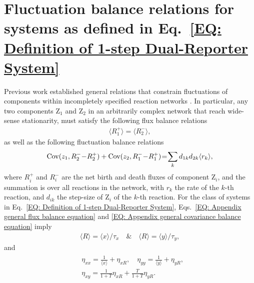 \documentclass[%
 reprint,prx,
superscriptaddress,
%
%
%
%
%
%
%
%
%
 amsmath,amssymb,
 aps,
%
%
%
%
%
%
]{revtex4-2}
\newcommand{\lb}{\langle}
\newcommand{\rb}{\rangle}
\begin{document}
\section{Fluctuation balance relations for systems as defined in Eq.~\eqref{EQ: Definition of 1-step Dual-Reporter System}}\vspace{-.75em}
\label{SEC: Appendix fluctuation balance relations}
%
%
%
Previous work established general relations that constrain fluctuations of components within incompletely specified reaction networks \cite{hilfinger2015a}.
%
%
%
%
%
In particular, any two components Z$_{1}$ and Z$_{2}$ in an arbitrarily complex network that reach wide-sense stationarity, must satisfy the following flux balance relations 
\begin{align}
    \langle R_{1}^{+} \rangle = \langle R_{2}^{-}\rangle,
    \label{EQ: Appendix general flux balance equation}
\end{align}
as well as the following fluctuation balance relations
\begin{align}
    \text{Cov}(z_{1},R_{2}^{-}\hspace{-.2em}-\hspace{-.2em} R_{2}^{+}) + \text{Cov}(z_{2},R_{1}^{-} \hspace{-.2em}-\hspace{-.2em} R_{1}^{+})  \hspace{-.2em}=\hspace{-.2em} \sum_{k}d_{1k}d_{2k}\langle r_{k}\rangle,
    \label{EQ: Appendix general covariance balance equation}
\end{align}
where $R_{i}^{+}$ and $R_{i}^{-}$ are the net birth and death fluxes of component Z$_{i}$, and  the summation  is over all reactions in the network, with $r_{k}$ the rate of the $k$-th reaction, and $d_{ik}$ the step-size of Z$_{i}$ of the $k$-th reaction. For the class of systems in Eq.~\eqref{EQ: Definition of 1-step Dual-Reporter System}, 
Eqs.~\eqref{EQ: Appendix general flux balance equation} and \eqref{EQ: Appendix general covariance balance equation} imply
\begin{align}
 \langle R \rangle = \langle x \rangle /\tau_{x} \quad \text{\&} \quad \langle R \rangle = \langle y \rangle /\tau_{y} ,
 \label{EQ: 1-step flux-balance relations}
\end{align}
and
\begin{align}
\begin{split}
&\eta_{xx} = \frac{1}{\lb x \rb} + \eta_{xR} ,\quad \eta_{yy} = \frac{1}{\lb y \rb} + \eta_{yR} , \\	 
&\eta_{xy} = \frac{1}{1+T}\eta_{xR}  + \frac{T}{1+T}\eta_{yR}  . 
\end{split}
\label{EQ: 1-step fluctuation-balance relations}
\end{align}
\end{document}

